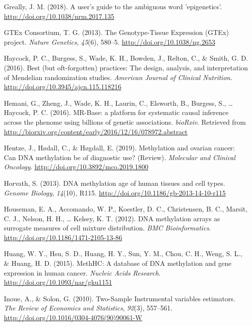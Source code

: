 \documentclass[11pt,twoside]{bristolthesis}
\newlength{\cslhangindent}
\newenvironment{cslreferences}%
  {\setlength{\parindent}{0pt}%
  \everypar{\setlength{\hangindent}{\cslhangindent}}\ignorespaces}%
  {\par}
\begin{document}
\begin{cslreferences}
\leavevmode\hypertarget{ref-Greally2018}{}%
Greally, J. M. (2018). A user's guide to the ambiguous word 'epigenetics'. \url{http://doi.org/10.1038/nrm.2017.135}

\leavevmode\hypertarget{ref-GTExConsortium2013}{}%
GTEx Consortium, T. G. (2013). The Genotype-Tissue Expression (GTEx) project. \emph{Nature Genetics}, \emph{45}(6), 580--5. \url{http://doi.org/10.1038/ng.2653}

\leavevmode\hypertarget{ref-Haycock2016}{}%
Haycock, P. C., Burgess, S., Wade, K. H., Bowden, J., Relton, C., \& Smith, G. D. (2016). Best (but oft-forgotten) practices: The design, analysis, and interpretation of Mendelian randomization studies. \emph{American Journal of Clinical Nutrition}. \url{http://doi.org/10.3945/ajcn.115.118216}

\leavevmode\hypertarget{ref-Hemani2016}{}%
Hemani, G., Zheng, J., Wade, K. H., Laurin, C., Elsworth, B., Burgess, S., \ldots{} Haycock, P. C. (2016). MR-Base: a platform for systematic causal inference across the phenome using billions of genetic associations. \emph{bioRxiv}. Retrieved from \url{http://biorxiv.org/content/early/2016/12/16/078972.abstract}

\leavevmode\hypertarget{ref-Hentze2019}{}%
Hentze, J., Hødall, C., \& Høgdall, E. (2019). Methylation and ovarian cancer: Can DNA methylation be of diagnostic use? (Review). \emph{Molecular and Clinical Oncology}. \url{http://doi.org/10.3892/mco.2019.1800}

\leavevmode\hypertarget{ref-Horvath2013}{}%
Horvath, S. (2013). DNA methylation age of human tissues and cell types. \emph{Genome Biology}, \emph{14}(10), R115. \url{http://doi.org/10.1186/gb-2013-14-10-r115}

\leavevmode\hypertarget{ref-Houseman2012}{}%
Houseman, E. A., Accomando, W. P., Koestler, D. C., Christensen, B. C., Marsit, C. J., Nelson, H. H., \ldots{} Kelsey, K. T. (2012). DNA methylation arrays as surrogate measures of cell mixture distribution. \emph{BMC Bioinformatics}. \url{http://doi.org/10.1186/1471-2105-13-86}

\leavevmode\hypertarget{ref-Huang2015}{}%
Huang, W. Y., Hsu, S. D., Huang, H. Y., Sun, Y. M., Chou, C. H., Weng, S. L., \& Huang, H. D. (2015). MethHC: A database of DNA methylation and gene expression in human cancer. \emph{Nucleic Acids Research}. \url{http://doi.org/10.1093/nar/gku1151}

\leavevmode\hypertarget{ref-Inoue2010}{}%
Inoue, A., \& Solon, G. (2010). Two-Sample Instrumental variables estimators. \emph{The Review of Economics and Statistics}, \emph{92}(3), 557--561. \url{http://doi.org/10.1016/0304-4076(90)90061-W}


\end{cslreferences}
\end{document}
